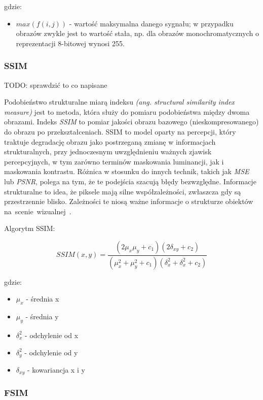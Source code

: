 \documentclass{article}
\begin{document}
gdzie:
\begin{itemize}[label=]
    \item $max(f(i,j))$ - wartość maksymalna danego sygnału; w przypadku obrazów zwykle jest to wartość stała, np. dla obrazów monochromatycznych o reprezentacji 8-bitowej wynosi 255.
\end{itemize}

\subsubsection{SSIM}

TODO: sprawdzić to co napisane

Podobieństwo strukturalne miarą indeksu \textit{(ang. structural similarity index measure)} jest to metoda, która służy 
do pomiaru podobieństwa między dwoma obrazami. Indeks \textit{SSIM} to pomiar jakości obrazu bazowego (nieskompresowanego) 
do obrazu po przekształceniach. SSIM to model oparty na percepcji, który traktuje degradację obrazu jako postrzeganą zmianę
w informacjach strukturalnych, przy jednoczesnym uwzględnieniu ważnych zjawisk percepcyjnych, w tym zarówno terminów maskowania 
luminancji, jak i maskowania kontrastu. Różnica w stosunku do innych technik, takich jak \textit{MSE} lub \textit{PSNR},
polega na tym, że te podejścia szacują błędy bezwzględne. Informacje strukturalne to idea, że piksele mają silne współzależności,
zwłaszcza gdy są przestrzennie blisko. Zależności te niosą ważne informacje o strukturze obiektów \mbox{na scenie wizualnej \cite{channappayya2008rate}.}

Algorytm SSIM:

\begin{equation}
SSIM(x, y) = \frac{(2\mu_{x}\mu_{y} + c_{1}) (2\delta_{xy} + c_2)}{(\mu_{x}^2 + \mu_{y}^2 + c_{1}) (\delta_{x}^2 + \delta_{x}^2 + c_2)}
\end{equation}

gdzie:
\begin{itemize}[label=]
    \item $\mu_{x}$ - średnia x
    \item $\mu_{y}$ - średnia y
    \item $\delta_{x}^2$ - odchylenie od x
    \item $\delta_{y}^2$ - odchylenie od y
    \item $\delta_{xy}$ - kowariancja x i y
\end{itemize}

\subsubsection{FSIM}
\end{document}
